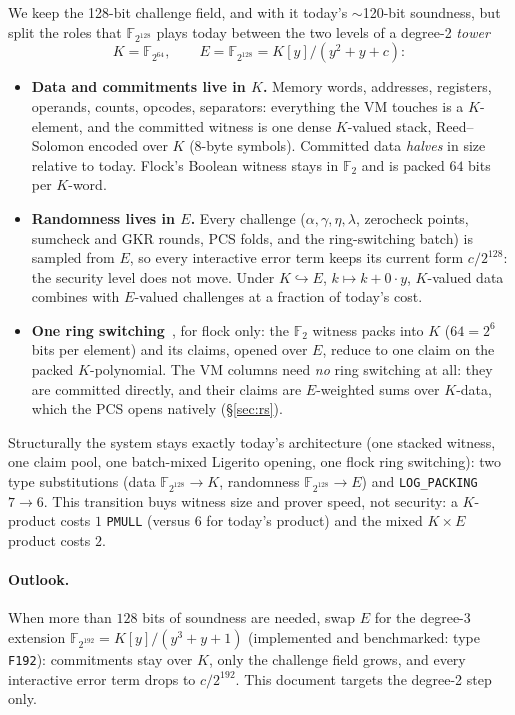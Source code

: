 \documentclass[11pt]{article}
\newcommand{\F}{\mathbb{F}}
\newcommand{\K}{K}            %
\newcommand{\E}{E}            %
\begin{document}
We keep the 128-bit challenge field, and with it today's $\sim$120-bit
soundness, but split the roles that $\F_{2^{128}}$ plays today between the
two levels of a degree-2 \emph{tower}
\[
  \K=\F_{2^{64}},\qquad \E=\F_{2^{128}}=\K[y]/(y^2+y+c):
\]
\begin{itemize}
\item \textbf{Data and commitments live in $\K$.} Memory words, addresses,
  registers, operands, counts, opcodes, separators: everything the VM
  touches is a $\K$-element, and the committed witness is one dense
  $\K$-valued stack, Reed--Solomon encoded over $\K$ (8-byte symbols).
  Committed data \emph{halves} in size relative to today. Flock's Boolean
  witness stays in $\F_2$ and is packed $64$ bits per $\K$-word.
\item \textbf{Randomness lives in $\E$.} Every challenge ($\alpha,\gamma,
  \eta,\lambda$, zerocheck points, sumcheck and GKR rounds, PCS folds, and
  the ring-switching batch) is sampled from $\E$, so every interactive
  error term keeps its current form $c/2^{128}$: the security level does
  not move. Under $\K\hookrightarrow\E$, $k\mapsto k+0\cdot y$, $\K$-valued
  data combines with $\E$-valued challenges at a fraction of today's cost.
\item \textbf{One ring switching}~\cite{rsgen}, for flock only: the $\F_2$
  witness packs into $\K$ ($64=2^6$ bits per element) and its claims,
  opened over $\E$, reduce to one claim on the packed $\K$-polynomial. The
  VM columns need \emph{no} ring switching at all: they are committed
  directly, and their claims are $\E$-weighted sums over $\K$-data, which
  the PCS opens natively (\S\ref{sec:rs}).
\end{itemize}
Structurally the system stays exactly today's architecture (one stacked
witness, one claim pool, one batch-mixed Ligerito opening, one flock ring
switching): two type substitutions (data $\F_{2^{128}}\to\K$, randomness
$\F_{2^{128}}\to\E$) and \texttt{LOG\_PACKING} $7\to6$. This transition
buys witness size and prover speed, not security: a $\K$-product costs $1$
\texttt{PMULL} (versus $6$ for today's product) and the mixed
$\K\times\E$ product costs $2$.

\paragraph{Outlook.} When more than $128$ bits of soundness are needed,
swap $\E$ for the degree-3 extension $\F_{2^{192}}=\K[y]/(y^3+y+1)$
(implemented and benchmarked: type \texttt{F192}): commitments stay over
$\K$, only the challenge field grows, and every interactive error term
drops to $c/2^{192}$. This document targets the degree-2 step only.
\end{document}
